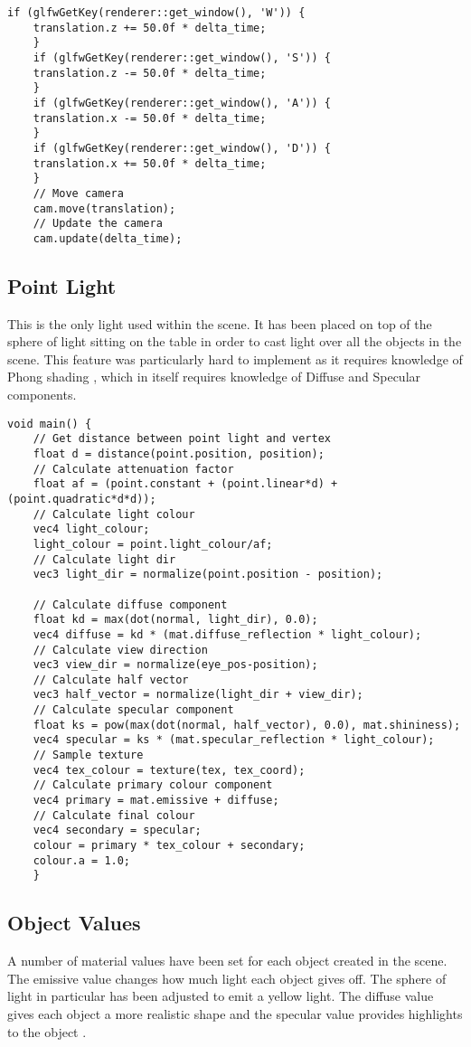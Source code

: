 \documentclass[10pt, a4paper]{article}
\begin{document}
	\begin{lstlisting}[caption = Free Camera movement keys]
	if (glfwGetKey(renderer::get_window(), 'W')) {
	translation.z += 50.0f * delta_time;
	}
	if (glfwGetKey(renderer::get_window(), 'S')) {
	translation.z -= 50.0f * delta_time;
	}
	if (glfwGetKey(renderer::get_window(), 'A')) {
	translation.x -= 50.0f * delta_time;
	}
	if (glfwGetKey(renderer::get_window(), 'D')) {
	translation.x += 50.0f * delta_time;
	}
	// Move camera
	cam.move(translation);
	// Update the camera
	cam.update(delta_time);
	\end{lstlisting}

	\subsection{Point Light}
	This is the only light used within the scene. It has been placed on top of the sphere of light sitting on the table in order to cast light over all the objects in the scene. This feature was particularly hard to implement as it requires knowledge of Phong shading \cite{Phong}, which in itself requires knowledge of Diffuse \cite{Diffuse} and Specular \cite{Specular}  components.
	
	\begin{lstlisting}[caption = Main section of fragment shader]
	void main() {
	// Get distance between point light and vertex
	float d = distance(point.position, position);
	// Calculate attenuation factor
	float af = (point.constant + (point.linear*d) + (point.quadratic*d*d));
	// Calculate light colour
	vec4 light_colour;
	light_colour = point.light_colour/af;
	// Calculate light dir
	vec3 light_dir = normalize(point.position - position);
	
	// Calculate diffuse component
	float kd = max(dot(normal, light_dir), 0.0);
	vec4 diffuse = kd * (mat.diffuse_reflection * light_colour);
	// Calculate view direction
	vec3 view_dir = normalize(eye_pos-position);
	// Calculate half vector
	vec3 half_vector = normalize(light_dir + view_dir);
	// Calculate specular component
	float ks = pow(max(dot(normal, half_vector), 0.0), mat.shininess);
	vec4 specular = ks * (mat.specular_reflection * light_colour);
	// Sample texture
	vec4 tex_colour = texture(tex, tex_coord);
	// Calculate primary colour component
	vec4 primary = mat.emissive + diffuse;
	// Calculate final colour
	vec4 secondary = specular;
	colour = primary * tex_colour + secondary;
	colour.a = 1.0;
	}
	\end{lstlisting}
	
	\subsection{Object Values}
	A number of material values have been set for each object created in the scene. The emissive value changes how much light each object gives off. The sphere of light in particular has been adjusted to emit a yellow light. The diffuse value gives each object a more realistic shape \cite{Diffuse} and the specular value provides highlights to the object \cite{Specular}.
	
\end{document}
